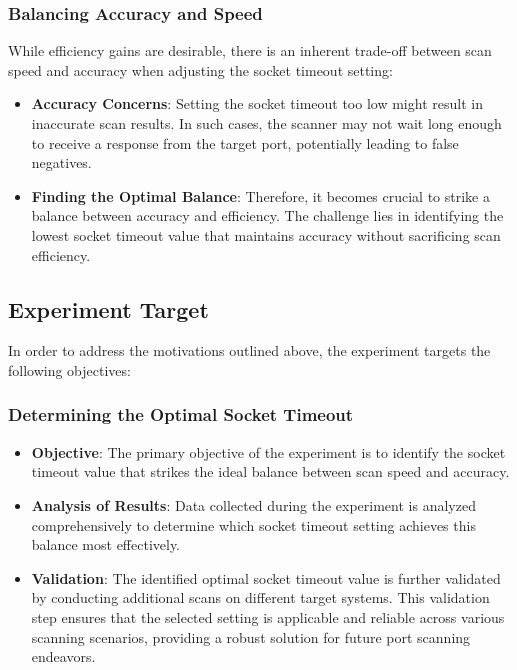 \subsubsection{Balancing Accuracy and Speed}

While efficiency gains are desirable, there is an inherent trade-off between scan speed and accuracy when adjusting the socket timeout setting:

\begin{itemize}
  \item \textbf{Accuracy Concerns}: Setting the socket timeout too low might result in inaccurate scan results. In such cases, the scanner may not wait long enough to receive a response from the target port, potentially leading to false negatives.

  \item \textbf{Finding the Optimal Balance}: Therefore, it becomes crucial to strike a balance between accuracy and efficiency. The challenge lies in identifying the lowest socket timeout value that maintains accuracy without sacrificing scan efficiency.
\end{itemize}

\subsection{Experiment Target}

In order to address the motivations outlined above, the experiment targets the following objectives:

\subsubsection{Determining the Optimal Socket Timeout}

\begin{itemize}
  \item \textbf{Objective}: The primary objective of the experiment is to identify the socket timeout value that strikes the ideal balance between scan speed and accuracy.
  
  \item \textbf{Analysis of Results}: Data collected during the experiment is analyzed comprehensively to determine which socket timeout setting achieves this balance most effectively.
  
  \item \textbf{Validation}: The identified optimal socket timeout value is further validated by conducting additional scans on different target systems. This validation step ensures that the selected setting is applicable and reliable across various scanning scenarios, providing a robust solution for future port scanning endeavors.
\end{itemize}

